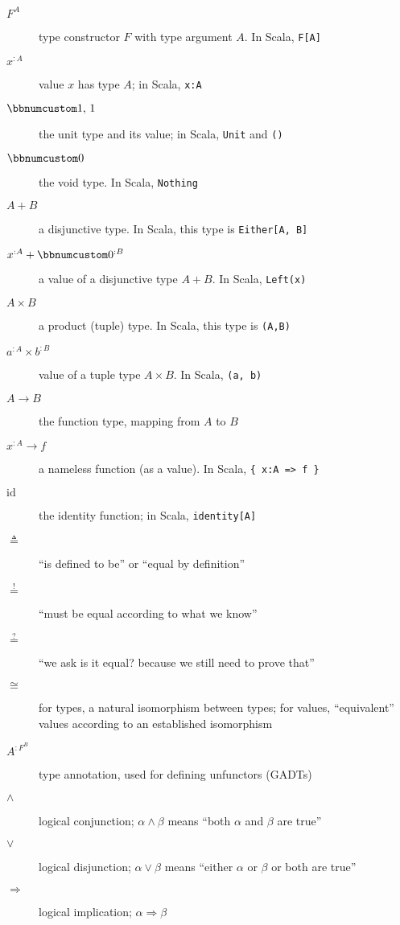 \begin{description}
\item [{$F^{A}$}] type constructor $F$ with type argument $A$. In Scala,
\lstinline!F[A]!
\item [{$x^{:A}$}] value $x$ has type $A$; in Scala, \lstinline!x:A!
\item [{$\bbnum 1,\,1$}] the unit type and its value; in Scala, \lstinline!Unit!
and \lstinline!()!
\item [{$\bbnum 0$}] the void type. In Scala, \lstinline!Nothing!
\item [{$A+B$}] a disjunctive type. In Scala, this type is \lstinline!Either[A, B]! 
\item [{$x^{:A}+\bbnum 0^{:B}$}] a value of a disjunctive type $A+B$.
In Scala, \lstinline!Left(x)!
\item [{$A\times B$}] a product (tuple) type. In Scala, this type is \lstinline!(A,B)!
\item [{$a^{:A}\times b^{:B}$}] value of a tuple type $A\times B$. In
Scala, \lstinline!(a, b)!
\item [{$A\rightarrow B$}] the function type, mapping from $A$ to $B$
\item [{$x^{:A}\rightarrow f$}] a nameless function (as a value). In Scala,
\lstinline!{ x:A => f }!
\item [{$\text{id}$}] the identity function; in Scala, \lstinline!identity[A]!
\item [{$\triangleq$}] \textsf{``}is defined to be\textsf{''} or \textsf{``}equal by definition\textsf{''}
\item [{$\overset{!}{=}$}] \textsf{``}must be equal according to what we know\textsf{''}
\item [{$\overset{?}{=}$}] \textsf{``}we ask \textemdash{} is it equal? \textemdash{}
because we still need to prove that\textsf{''}
\item [{$\cong$}] for types, a natural isomorphism between types; for
values, \textsf{``}equivalent\textsf{''} values according to an established isomorphism
\item [{$A^{:F^{B}}$}] type annotation, used for defining unfunctors (GADTs)
\item [{$\wedge$}] logical conjunction; $\alpha\wedge\beta$ means \textsf{``}both
$\alpha$ and $\beta$ are true\textsf{''}
\item [{$\vee$}] logical disjunction; $\alpha\vee\beta$ means \textsf{``}either
$\alpha$ or $\beta$ or both are true\textsf{''}
\item [{$\Rightarrow$}] logical implication; $\alpha\Rightarrow\beta$

\end{description}
